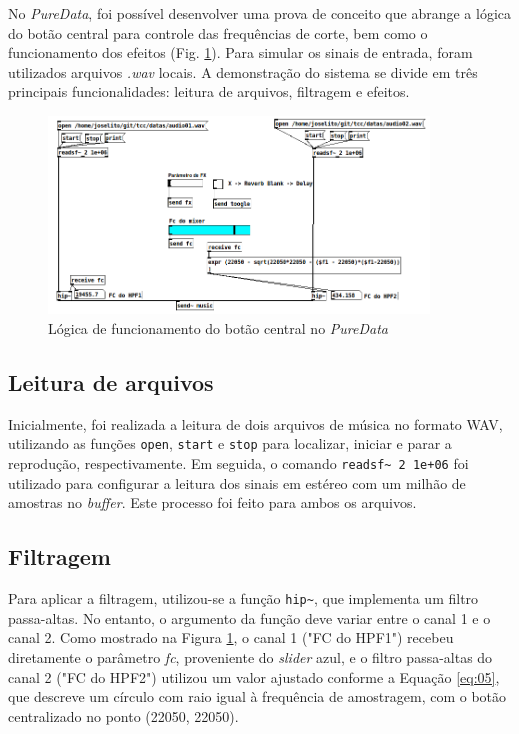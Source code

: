 No \textit{PureData}, foi possível desenvolver uma prova de conceito que abrange a lógica do botão central para controle das frequências de corte, bem como o funcionamento dos efeitos (Fig. \ref{fig44}). Para simular os sinais de entrada, foram utilizados arquivos \textit{.wav} locais. A demonstração do sistema se divide em três principais funcionalidades: leitura de arquivos, filtragem e efeitos.

\begin{figure}[h]
    \centering
    \includegraphics[width=0.9\textwidth]{figuras/fig44.png}
    \caption{Lógica de funcionamento do botão central no \textit{PureData}}
    \label{fig44}
\end{figure}

\subsection{Leitura de arquivos}

Inicialmente, foi realizada a leitura de dois arquivos de música no formato WAV, utilizando as funções \texttt{open}, \texttt{start} e \texttt{stop} para localizar, iniciar e parar a reprodução, respectivamente. Em seguida, o comando \texttt{readsf\textasciitilde\ 2 1e+06} foi utilizado para configurar a leitura dos sinais em estéreo com um milhão de amostras no \textit{buffer}. Este processo foi feito para ambos os arquivos.

\subsection{Filtragem}


Para aplicar a filtragem, utilizou-se a função \texttt{hip\textasciitilde}, que implementa um filtro passa-altas. No entanto, o argumento da função deve variar entre o canal 1 e o canal 2. Como mostrado na Figura \ref{fig44}, o canal 1 ("FC do HPF1") recebeu diretamente o parâmetro \textit{fc}, proveniente do \textit{slider} azul, e o filtro passa-altas do canal 2 ("FC do HPF2") utilizou um valor ajustado %
conforme a Equação \ref{eq:05}, que descreve um círculo com raio igual à frequência de amostragem, com o botão centralizado no ponto (22050, 22050). 


